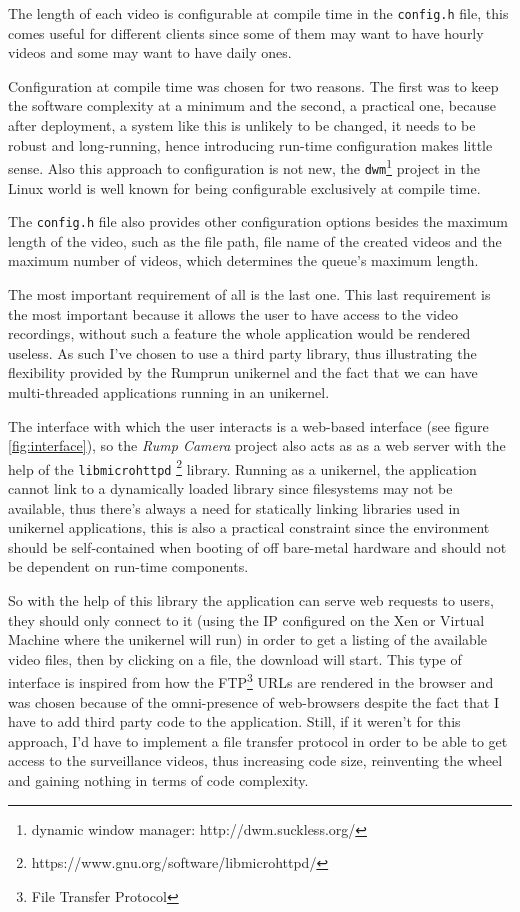 \documentclass[10pt,a4paper,twoside]{article}
\begin{document}
The length of each video is configurable at compile time in the \texttt{config.h} file, this comes
useful for different clients since some of them may want to have hourly videos and some may want to have daily ones.

Configuration at compile time was chosen for two reasons.
The first was to keep the software complexity at a minimum and the second, a practical one,
because after deployment, a system like this is unlikely to be changed, it needs to be robust and long-running,
hence introducing run-time configuration makes little sense. Also this approach to configuration is not new, the
\texttt{dwm}\footnote{dynamic window manager: http://dwm.suckless.org/} project in the Linux world is well known for
being configurable exclusively at compile time.

The \texttt{config.h} file also provides other configuration options besides the maximum length of the video,
such as the file path, file name of the created videos and the maximum number of videos,
which determines the queue's maximum length.

The most important requirement of all is the last one.
This last requirement is the most important because it allows the user to have access to the video recordings,
without such a feature the whole application would be rendered useless.
As such I've chosen to use a third party library, thus illustrating the flexibility provided by the
Rumprun unikernel and the fact that we can have multi-threaded applications running in an unikernel.

The interface with which the user interacts is a web-based interface (see figure \ref{fig:interface}),
so the \textit{Rump Camera}
project also acts as as a web server with the help of the \texttt{libmicrohttpd}
\footnote{https://www.gnu.org/software/libmicrohttpd/} library. Running as a unikernel, the application
cannot link to a dynamically loaded library since filesystems may not be available,
thus there's always a need for statically linking libraries used in unikernel applications,
this is also a practical constraint since
the environment should be self-contained when booting of off bare-metal hardware and should not be dependent
on run-time components.

So with the help of this library the application can serve web requests to users,
they should only connect to it (using the IP configured on the Xen or Virtual Machine where
the unikernel will run) in order to get a listing of the available video files,
then by clicking on a file, the download will start.
This type of interface is inspired from how the FTP\footnote{File Transfer Protocol}
URLs are rendered in the browser and was chosen because of the omni-presence of
web-browsers despite the fact that I have to add third party code to the application.
Still, if it weren't for this approach, I'd
have to implement a file transfer protocol in order to be able to get access to the surveillance videos, thus
increasing code size, reinventing the wheel and gaining nothing in terms of code complexity.
\end{document}
